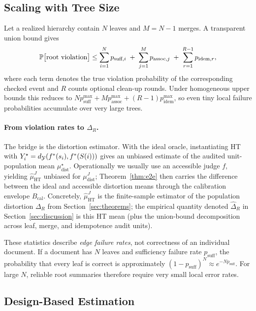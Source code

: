 \subsection{Scaling with Tree Size}

Let a realized hierarchy contain $N$ leaves and $M = N-1$ merges. A transparent union bound gives
\begin{equation}\label{eq:error_budget}
\mathbb{P}\big[\text{root violation}\big]
\le
\sum_{i=1}^{N} p_{\text{suff},i}
\;+\;
\sum_{j=1}^{M} p_{\text{assoc},j}
\;+\;
\sum_{r=1}^{R-1} p_{\text{idem},r},
\end{equation}
where each term denotes the true violation probability of the corresponding checked event and $R$ counts optional clean-up rounds. Under homogeneous upper bounds this reduces to $N p_{\text{suff}}^{\max}+M p_{\text{assoc}}^{\max}+(R-1)p_{\text{idem}}^{\max}$, so even tiny local failure probabilities accumulate over very large trees.

\paragraph{From violation rates to $\Delta_R$.}
The bridge is the distortion estimator. With the ideal oracle, instantiating HT with $Y_i^\star=d_{\mathcal{Y}}(f^\ast(s_i),f^\ast(S(i)))$ gives an unbiased estimate of the audited unit-population mean $\mu_{\mathrm{dist}}^\star$. Operationally we usually use an accessible judge $f$, yielding $\hat{\mu}_{\mathrm{HT}}^{J}$ unbiased for $\mu_{\mathrm{dist}}^{J}$; Theorem~\ref{thm:e2e} then carries the difference between the ideal and accessible distortion means through the calibration envelope $B_{\mathrm{cal}}$. Concretely, $\hat{\mu}_{\mathrm{HT}}^{J}$ is the finite-sample estimator of the population distortion $\Delta_R$ from Section~\ref{sec:theorems}; the empirical quantity denoted $\hat\Delta_R$ in Section~\ref{sec:discussion} is this HT mean (plus the union-bound decomposition across leaf, merge, and idempotence audit units).

These statistics describe \emph{edge failure rates}, not correctness of an individual document. If a document has $N$ leaves and sufficiency failure rate $p_{\text{suff}}$, the probability that every leaf is correct is approximately $(1-p_{\text{suff}})^N \approx e^{-Np_{\text{suff}}}$. For large $N$, reliable root summaries therefore require very small local error rates.

\subsection{Design-Based Estimation}

